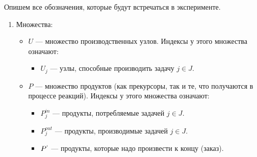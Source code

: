 \documentclass[12pt, twoside]{article}
\theoremstyle{definition}
\begin{document}
Опишем все обозначения, которые будут встречаться в эксперименте.

\begin{enumerate}
   \item Множества:
   \begin{itemize}
     \item $U$ --- множество производственных узлов. Индексы у этого множества означают:
     \begin{itemize}
     		\item $U_j$ --- узлы, способные производить задачу $j \in J$.
     \end{itemize}
     \item $P$ --- множество продуктов (как прекурсоры, так и те, что получаются в процессе реакций). Индексы у этого множества означают:
		\begin{itemize}
     		\item $P^{in}_j$ --- продукты, потребляемые задачей $j \in J$.
     		\item $P^{out}_j$ --- продукты, производимые задачей $j \in J$.
     		\item $P^{`}$ --- продукты, которые надо произвести к концу (заказ).
     \end{itemize}
     

\end{itemize}
\end{enumerate}
\end{document}
